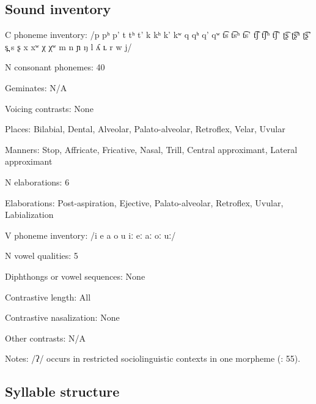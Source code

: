 {\subsection*{Sound inventory}
\begin{appendixdesc}

\item[C phoneme inventory:] /p pʰ p’ t tʰ t’ k kʰ k’ kʷ q qʰ q’ qʷ t͡s t͡sʰ t͡s’ t͡ʃ t͡ʃʰ t͡ʃ’ ʈ͡ʂ ʈ͡ʂʰ ʈ͡ʂ’ s̪ s ʂ x xʷ χ χʷ m n ɲ ŋ l ʎ ʟ r w j/

\item[N consonant phonemes:] 40

\item[Geminates:] N/A

\item[Voicing contrasts:] None

\item[Places:] Bilabial, Dental, Alveolar, Palato-alveolar, Retroflex, Velar, Uvular

\item[Manners:] Stop, Affricate, Fricative, Nasal, Trill, Central approximant, Lateral approximant

\item[N elaborations:] 6

\item[Elaborations:] Post-aspiration, Ejective, Palato-alveolar, Retroflex, Uvular, Labialization

\item[V phoneme inventory:] /i e a o u iː eː aː oː uː/

\item[N vowel qualities:] 5

\item[Diphthongs or vowel sequences:] None

\item[Contrastive length:] All

\item[Contrastive nasalization:] None

\item[Other contrasts:] N/A

\item[Notes:] /ʔ/ occurs in restricted sociolinguistic contexts in one morpheme (\citealt{Cerrón-Palomino2006}: 55).
\end{appendixdesc}
\subsection*{Syllable structure}
\begin{appendixdesc}


\end{appendixdesc}}
